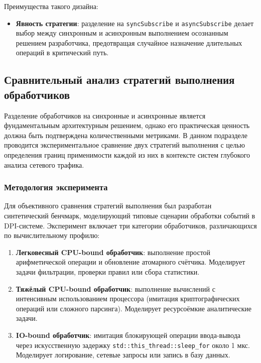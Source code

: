 Преимущества такого дизайна:
\begin{itemize}
    \item \textbf{Явность стратегии}: разделение на \texttt{syncSubscribe} и \texttt{asyncSubscribe} делает выбор между синхронным и асинхронным выполнением осознанным решением разработчика, предотвращая случайное назначение длительных операций в критический путь.
\end{itemize}

\subsection{Сравнительный анализ стратегий выполнения обработчиков}

Разделение обработчиков на синхронные и асинхронные является фундаментальным архитектурным решением, однако его практическая ценность должна быть подтверждена количественными метриками. В данном подразделе проводится экспериментальное сравнение двух стратегий выполнения с целью определения границ применимости каждой из них в контексте систем глубокого анализа сетевого трафика.

\subsubsection{Методология эксперимента}

Для объективного сравнения стратегий выполнения был разработан синтетический бенчмарк, моделирующий типовые сценарии обработки событий в DPI-системе. Эксперимент включает три категории обработчиков, различающихся по вычислительному профилю:

\begin{enumerate}
    \item \textbf{Легковесный CPU-bound обработчик}: выполнение простой арифметической операции и обновление атомарного счётчика. Моделирует задачи фильтрации, проверки правил или сбора статистики.

    \item \textbf{Тяжёлый CPU-bound обработчик}: выполнение вычислений с интенсивным использованием процессора (имитация криптографических операций или сложного парсинга). Моделирует ресурсоёмкие аналитические задачи.

    \item \textbf{IO-bound обработчик}: имитация блокирующей операции ввода-вывода через искусственную задержку \texttt{std::this\_thread::sleep\_for} около 1 мкс. Моделирует логирование, сетевые запросы или запись в базу данных.
\end{enumerate}

